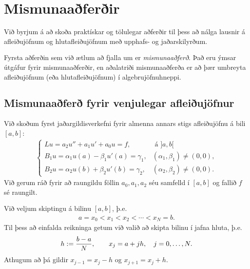 \documentclass[a4paper,10pt,icelandic]{sphinxmanual}
\begin{document}
\chapter{Mismunaaðferðir}
\label{\detokenize{Kafli05:mismunaaferir}}\label{\detokenize{Kafli05::doc}}
Við byrjum á að skoða praktískar og tölulegar aðferðir til þess að nálga lausnir á afleiðujöfnum og hlutafleiðujöfnum með upphafs- og jaðarskilyrðum.

Fyrsta aðferðin sem við ætlum að fjalla um er \textit{mismunaaðferð}.
Það eru ýmsar útgáfur fyrir mismunaaðferðir, en aðalatriði mismunaaðferða er að þær umbreyta afleiðujöfnum (eða hlutafleiðujöfnum) í algebrujöfnuhneppi.


\section{Mismunaaðferð fyrir venjulegar afleiðujöfnur}
\label{\detokenize{Kafli05:mismunaafer-fyrir-venjulegar-afleiujofnur}}\label{\detokenize{Kafli05:ch-5-1}}
Við skoðum fyrst jaðargildisverkefni fyrir almenna annars stigs afleiðujöfnu á bili \([a,b]\):
\begin{equation}\label{equation:Kafli05:eq.ODE1}
\begin{split}\begin{cases}
  Lu=a_2u''+a_1u'+a_0u=f,& \text{ á } ]a,b[\\
  B_1u=\alpha_1u(a)-\beta_1u'(a)=\gamma_1,&(\alpha_1,\beta_1)\neq (0,0),\\
  B_2u=\alpha_2u(b)+\beta_2u'(b)=\gamma_2,&(\alpha_2,\beta_2)\neq (0,0).
  \end{cases}\end{split}
\end{equation}
Við gerum ráð fyrir að raungildu föllin \(a_0, a_1,a_2\) séu samfelld í \([a,b]\) og fallið \(f\) sé raungilt.

Við veljum skiptingu á bilinu \([a,b]\), þ.e.
\begin{equation*}
\begin{split}a=x_0<x_1<x_2<\cdots <x_N=b.\end{split}
\end{equation*}
Til þess að einfalda reikninga getum við valið að skipta bilinu í jafna hluta, þ.e.
\begin{equation*}
\begin{split}h:= {b-a\over N}, \qquad x_j=a+jh,  \quad j=0, \dots, N.\end{split}
\end{equation*}
Athugum að þá gildir \(x_{j-1}=x_j-h\) og \(x_{j+1}=x_j+h\).
\end{document}
